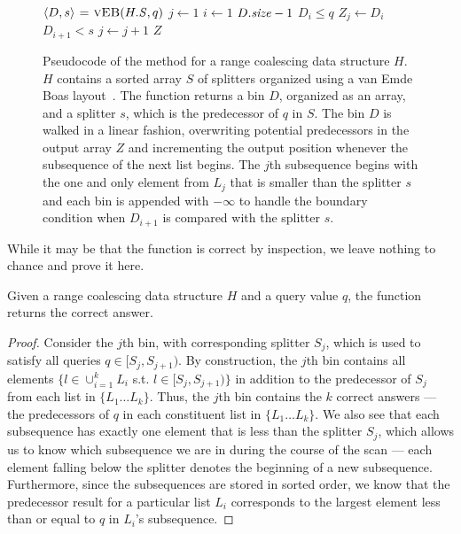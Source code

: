 \begin{figure}[t] 
  \begin{codebox*}
    \li $\langle D, s \rangle \gets \proc{vEB}(\attrib{H}{S},q)$ 
    \li $j \gets 1$
    \li \For $i \gets 1$ \To $\attrib{D}{\id{size}} - 1$ \Do
    \li   \If $D_i \leq q$ \Do
    \li     $Z_j \gets D_i$
          \End
    \li   \If $D_{i+1} < s$ \Do
    \li     $j \gets j + 1$
          \End
        \End
    \li \Return $Z$
  \end{codebox*}
\caption{Pseudocode of the  method for a range coalescing data
structure $H$.  $H$ contains a sorted array $S$ of splitters organized using
a van Emde Boas layout~\cite{BenderDeFa00}.  The function  returns 
a bin $D$, organized as an array, and a splitter $s$, which is the predecessor 
of $q$ in $S$.  The bin $D$ is walked in a linear fashion, overwriting potential
predecessors in the output array $Z$ and incrementing the output position whenever
the subsequence of the next list begins.  The $j$th subsequence begins with the
one and only element from $L_j$ that is smaller than the splitter $s$ and each
bin is appended with $-\infty$ to handle the boundary condition when $D_{i+1}$ is
compared with the splitter $s$. }
\label{fig:query} 
\end{figure}

While it may be that the function  is correct by inspection, we leave
nothing to chance and prove it here.

\begin{lemma}
Given a range coalescing data structure
$H$ and a query value $q$, the function  
returns the correct answer.
\end{lemma}
\begin{proof}
Consider the $j$th bin, with corresponding splitter $S_j$, which is used to satisfy
all queries $q \in [S_j, S_{j+1})$.  By construction, the $j$th bin contains all
elements $\{l \in \cup_{i=1}^{k} L_i$ s.t. $l \in [S_j, S_{j+1}) \}$ in addition to 
the predecessor of $S_j$ from each list in $\{ L_1 \ldots L_k \}$.  
Thus, the $j$th bin contains the $k$ correct
answers --- the predecessors of $q$ in each constituent list in $\{ L_1 \ldots L_k \}$.  
We also see that each subsequence has exactly one element that is less
than the splitter $S_j$, which allows us to know which subsequence we are in during
the course of the scan --- each element falling below the splitter denotes the 
beginning of a new subsequence.  Furthermore, since the subsequences are stored in sorted
order, we know that the predecessor result for a particular list $L_i$ corresponds to 
the largest element less than or equal to $q$ in $L_i$'s subsequence.
\end{proof}

